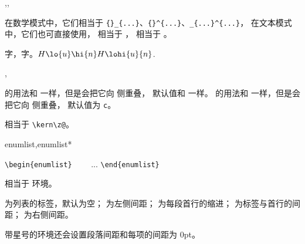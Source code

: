 \documentclass[twoside]{book}
\def\xampletext{\par}
\def\xampleprint{\xamplecode \xampleline \xampletext}
\begin{document}
\begin{function}{\lo,\hi,\lohi} 
  \begin{syntax}
    \V\lo   {}
    \V\hi   {}
    \V\lohi {} 
  \end{syntax}
在数学模式中，它们相当于 \verb|{}_{...}|、\verb|{}^{...}|、\verb|_{...}^{...}|，
在文本模式中，它们也可直接使用， 相当于 ，
 相当于 。
\end{function}

\begin{xample}
\Large 字，字。$ H\lo{u}\hi{n} H\lohi{u}{n}$.
\stopxamplecode
\xampleprint
\end{xample}

\begin{function}{\makelapbox,\parlapbox}
  \begin{syntax}
    \V\makelapbox {}
    \V\makelapbox {}  
    \V\makelapbox {}   
    \V\parlapbox  {} 
    \V\parlapbox  {}    
    \V\parlapbox  {}     
  \end{syntax}
 的用法和  一样，但是会把它向  侧重叠，
 默认值和  一样。
 的用法和  一样，但是会把它向  侧重叠，
 默认值为 \texttt{c}。
\end{function}

\begin{function}{\zkern}
相当于 \verb|\kern\z@|。
\end{function}

\begin{function}[type=environment]{enumlist,enumlist*}
  \begin{syntax}
    \verb|\begin{enumlist}|     
    ~~~~...
    \verb|\end{enumlist}|
  \end{syntax}
相当于  环境。

 为列表的标签，默认为空； 为左侧间距；
 为每段首行的缩进； 为标签与首行的间距；
 为右侧间距。

带星号的环境还会设置段落间距和每项的间距为 0pt。
\end{function}
\end{document}
